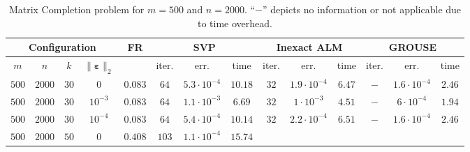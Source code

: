 \documentclass[twocolumn]{svjour3}
\newcommand{\vectornormbig}[1]{\big\|#1\big\|}
\newcommand{\noise}{\boldsymbol{\varepsilon}}
\newcommand{\rank}{k}
\begin{document}
\begin{table*} [!htp]
\caption{Matrix Completion problem for $m = 500$ and $n = 2000$. ``$-$'' depicts no information or not applicable due to time overhead.} {\label{table:4}}
\begin{center}
\begin{tabular}{|c|c|c|c|c|c|c|c|c|c|c|c|c|c}
\multicolumn{4}{c|}{Configuration} & FR & \multicolumn{3}{|c|}{SVP} & \multicolumn{3}{|c|}{Inexact ALM} & \multicolumn{3}{|c}{GROUSE} \\
\hline \hline
\multicolumn{1}{c}{$m$}  & \multicolumn{1}{c}{$n$} & \multicolumn{1}{c}{$\rank$} & \multicolumn{1}{c|}{$\vectornormbig{\noise}_2$} & & 
\multicolumn{1}{|c}{\rm{iter.}} & \multicolumn{1}{c}{\rm{err.}} & \multicolumn{1}{c|}{\rm{time}} &
\multicolumn{1}{|c}{\rm{iter.}} & \multicolumn{1}{c}{\rm{err.}} & \multicolumn{1}{c|}{\rm{time}} &
\multicolumn{1}{|c}{\rm{iter.}} & \multicolumn{1}{c}{\rm{err.}} & \multicolumn{1}{c}{\rm{time}} \\
\hline\hline
\multicolumn{1}{c}{$500$} & \multicolumn{1}{c}{$2000$} & \multicolumn{1}{c}{$30$} & \multicolumn{1}{c|}{$0$} & $ 0.083 $ & 
\multicolumn{1}{|c}{$64$} & \multicolumn{1}{c}{$5.3\cdot 10^{-4}$} & \multicolumn{1}{c|}{$10.18$} &
\multicolumn{1}{|c}{$32$} & \multicolumn{1}{c}{$1.9\cdot 10^{-4}$} & \multicolumn{1}{c|}{$6.47$} &
\multicolumn{1}{|c}{$-$} & \multicolumn{1}{c}{$1.6\cdot 10^{-4}$} & \multicolumn{1}{c}{$\mathbf{2.46}$} \\
\hline
\multicolumn{1}{c}{$500$} & \multicolumn{1}{c}{$2000$} & \multicolumn{1}{c}{$30$} & \multicolumn{1}{c|}{$10^{-3}$} & $ 0.083 $ & 
\multicolumn{1}{|c}{$64$} & \multicolumn{1}{c}{$1.1\cdot 10^{-3}$} & \multicolumn{1}{c|}{$6.69$} &
\multicolumn{1}{|c}{$32$} & \multicolumn{1}{c}{$1\cdot 10^{-3}$} & \multicolumn{1}{c|}{$4.51$} &
\multicolumn{1}{|c}{$-$} & \multicolumn{1}{c}{$6\cdot 10^{-4}$} & \multicolumn{1}{c}{$\mathbf{1.94}$} \\
\hline
\multicolumn{1}{c}{$500$} & \multicolumn{1}{c}{$2000$} & \multicolumn{1}{c}{$30$} & \multicolumn{1}{c|}{$10^{-4}$} & $ 0.083 $ & 
\multicolumn{1}{|c}{$64$} & \multicolumn{1}{c}{$5.4\cdot 10^{-4}$} & \multicolumn{1}{c|}{$10.14$} &
\multicolumn{1}{|c}{$32$} & \multicolumn{1}{c}{$2.2\cdot 10^{-4}$} & \multicolumn{1}{c|}{$6.51$} &
\multicolumn{1}{|c}{$-$} & \multicolumn{1}{c}{$1.6\cdot 10^{-4}$} & \multicolumn{1}{c}{$\mathbf{2.46}$} \\
\hline
\multicolumn{1}{c}{$500$} & \multicolumn{1}{c}{$2000$} & \multicolumn{1}{c}{$50$} & \multicolumn{1}{c|}{$0$} & $ 0.408 $ & 
\multicolumn{1}{|c}{$103$} & \multicolumn{1}{c}{$1.1\cdot 10^{-4}$} & \multicolumn{1}{c|}{$15.74$} &

\end{tabular}
\end{center}
\end{table*}
\end{document}
